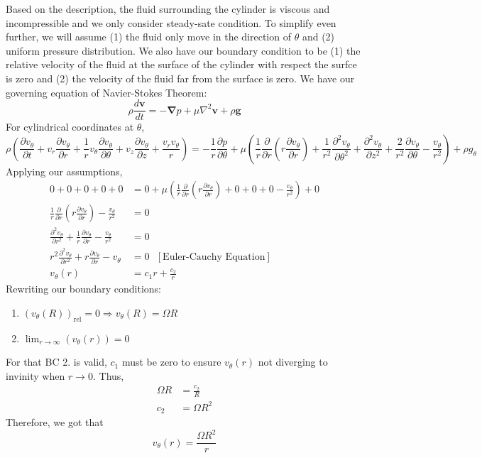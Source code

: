\documentclass[10pt]{article}
\begin{document}
Based on the description, the fluid surrounding the cylinder is viscous and incompressible and we only consider steady-sate condition. To simplify even further, we will assume (1) the fluid only move in the direction of $\theta$ and (2) uniform pressure distribution. We also have our boundary condition to be (1) the relative velocity of the fluid at the surface of the cylinder with respect the surfce is zero and (2) the velocity of the fluid far from the surface is zero. We have our governing equation of Navier-Stokes Theorem:
\begin{equation}
    \rho \frac{d \mathbf{v}}{dt} = -\mathbf{\nabla}p + \mu \nabla^2 \mathbf{v} + \rho \mathbf{g}
\end{equation}
For cylindrical coordinates at $\theta$,
\begin{equation}
    \rho\left( \frac{\partial v_\theta}{\partial t} + v_r \frac{\partial v_\theta}{\partial r} + \frac{1}{r} v_\theta \frac{\partial v_\theta}{\partial \theta} + v_z \frac{\partial v_\theta}{\partial z} + \frac{v_r v_\theta}{r}\right) = -\frac{1}{r} \frac{\partial p}{\partial \theta} + \mu \left(\frac{1}{r} \frac{\partial}{\partial r}\left(r \frac{\partial v_\theta}{\partial r}\right) + \frac{1}{r^2} \frac{\partial^2 v_\theta}{\partial \theta^2} + \frac{\partial^2 v_\theta}{\partial z^2} + \frac{2}{r^2} \frac{\partial v_\theta}{\partial \theta} - \frac{v_\theta}{r^2}\right) + \rho g_\theta
\end{equation}
Applying our assumptions,
\begin{align*}
    0 + 0 + 0 + 0 + 0 &= 0 + \mu \left(\frac{1}{r} \frac{\partial}{\partial r}\left(r \frac{\partial v_\theta}{\partial r}\right) + 0 + 0 + 0 - \frac{v_\theta}{r^2}\right) + 0 \\
    \frac{1}{r} \frac{\partial}{\partial r}\left(r \frac{\partial v_\theta}{\partial r}\right) - \frac{v_\theta}{r^2} &= 0 \\
    \frac{\partial^2 v_\theta}{\partial r^2} + \frac{1}{r} \frac{\partial v_\theta}{\partial r} - \frac{v_\theta}{r^2} &= 0 \\
    r^2 \frac{\partial^2 v_\theta}{\partial r^2} + r \frac{\partial v_\theta}{\partial r} - v_\theta &= 0\hspace{8pt}\left[\textrm{Euler-Cauchy Equation}\right] \\
    v_\theta (r) &= c_1 r + \frac{c_2}{r} 
\end{align*}
Rewriting our boundary conditions:
\begin{enumerate}
    \item $(v_\theta (R))_{\textrm{rel}} = 0 \Rightarrow v_\theta (R) = \Omega R$
    \item $\lim_{r \rightarrow \infty} (v_\theta (r)) = 0$
\end{enumerate}
For that BC 2. is valid, $c_1$ must be zero to ensure $v_\theta (r)$ not diverging to invinity when $r \rightarrow 0$. Thus,
\begin{align*}
    \Omega R &= \frac{c_2}{R} \\
    c_2 &= \Omega R^2
\end{align*}
Therefore, we got that
\begin{equation*}
    v_\theta (r) = \frac{\Omega R^2}{r}
\end{equation*}
\end{document}
